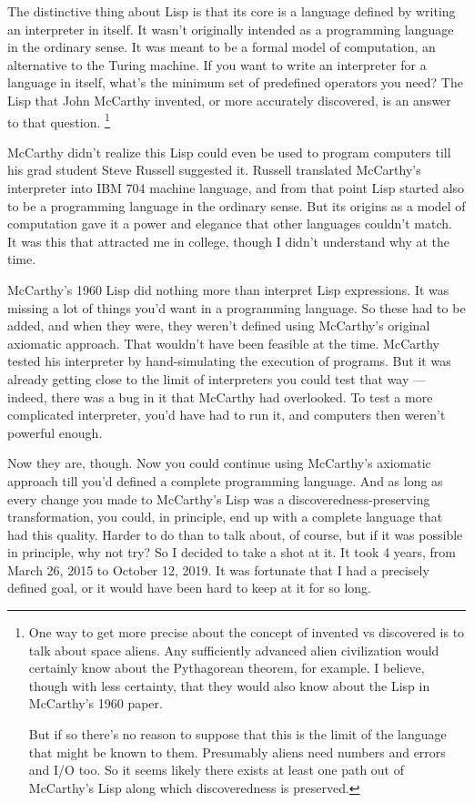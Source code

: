The distinctive thing about Lisp is that its core is a language defined
by writing an interpreter in itself. It wasn't originally intended as a
programming language in the ordinary sense. It was meant to be a formal
model of computation, an alternative to the Turing machine. If you want
to write an interpreter for a language in itself, what's the minimum set
of predefined operators you need? The Lisp that John McCarthy invented,
or more accurately discovered, is an answer to that question.
\footnote{One way to get more precise about the concept of invented vs
discovered is to talk about space aliens. Any sufficiently advanced
alien civilization would certainly know about the Pythagorean theorem,
for example. I believe, though with less certainty, that they would also
know about the Lisp in McCarthy's 1960 paper.

But if so there's no reason to suppose that this is the limit of the
language that might be known to them. Presumably aliens need numbers and
errors and I/O too. So it seems likely there exists at least one path
out of McCarthy's Lisp along which discoveredness is preserved.}

McCarthy didn't realize this Lisp could even be used to program
computers till his grad student Steve Russell suggested it. Russell
translated McCarthy's interpreter into IBM 704 machine language, and
from that point Lisp started also to be a programming language in the
ordinary sense. But its origins as a model of computation gave it a
power and elegance that other languages couldn't match. It was this that
attracted me in college, though I didn't understand why at the time.

McCarthy's 1960 Lisp did nothing more than interpret Lisp expressions.
It was missing a lot of things you'd want in a programming language. So
these had to be added, and when they were, they weren't defined using
McCarthy's original axiomatic approach. That wouldn't have been feasible
at the time. McCarthy tested his interpreter by hand-simulating the
execution of programs. But it was already getting close to the limit of
interpreters you could test that way --- indeed, there was a bug in it
that McCarthy had overlooked. To test a more complicated interpreter,
you'd have had to run it, and computers then weren't powerful enough.

Now they are, though. Now you could continue using McCarthy's axiomatic
approach till you'd defined a complete programming language. And as long
as every change you made to McCarthy's Lisp was a
discoveredness-preserving transformation, you could, in principle, end
up with a complete language that had this quality. Harder to do than to
talk about, of course, but if it was possible in principle, why not try?
So I decided to take a shot at it. It took 4 years, from March 26, 2015
to October 12, 2019. It was fortunate that I had a precisely defined
goal, or it would have been hard to keep at it for so long.

